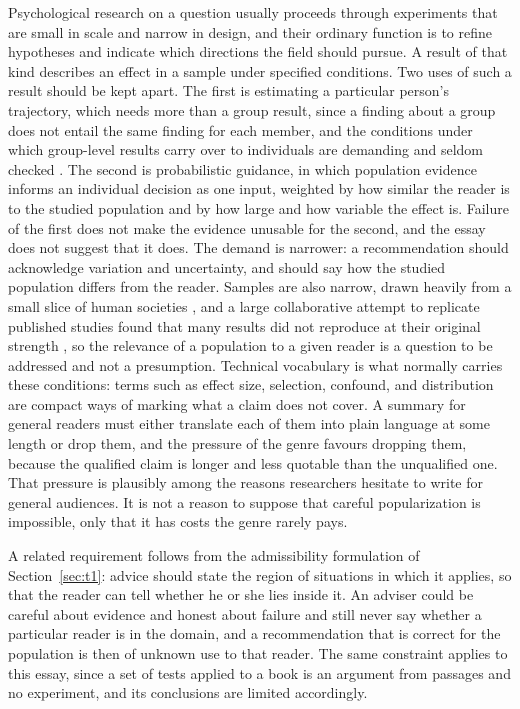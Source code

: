 \documentclass[12pt]{article}
\begin{document}
Psychological research on a question usually proceeds through experiments that are small in scale and narrow in design, and their ordinary function is to refine hypotheses and indicate which directions the field should pursue. A result of that kind describes an effect in a sample under specified conditions. Two uses of such a result should be kept apart. The first is estimating a particular person's trajectory, which needs more than a group result, since a finding about a group does not entail the same finding for each member, and the conditions under which group-level results carry over to individuals are demanding and seldom checked \cite{molenaar2004,fisher2018}. The second is probabilistic guidance, in which population evidence informs an individual decision as one input, weighted by how similar the reader is to the studied population and by how large and how variable the effect is. Failure of the first does not make the evidence unusable for the second, and the essay does not suggest that it does. The demand is narrower: a recommendation should acknowledge variation and uncertainty, and should say how the studied population differs from the reader. Samples are also narrow, drawn heavily from a small slice of human societies \cite{henrich2010}, and a large collaborative attempt to replicate published studies found that many results did not reproduce at their original strength \cite{osc2015}, so the relevance of a population to a given reader is a question to be addressed and not a presumption. Technical vocabulary is what normally carries these conditions: terms such as effect size, selection, confound, and distribution are compact ways of marking what a claim does not cover. A summary for general readers must either translate each of them into plain language at some length or drop them, and the pressure of the genre favours dropping them, because the qualified claim is longer and less quotable than the unqualified one. That pressure is plausibly among the reasons researchers hesitate to write for general audiences. It is not a reason to suppose that careful popularization is impossible, only that it has costs the genre rarely pays.

A related requirement follows from the admissibility formulation of Section~\ref{sec:t1}: advice should state the region of situations in which it applies, so that the reader can tell whether he or she lies inside it. An adviser could be careful about evidence and honest about failure and still never say whether a particular reader is in the domain, and a recommendation that is correct for the population is then of unknown use to that reader. The same constraint applies to this essay, since a set of tests applied to a book is an argument from passages and no experiment, and its conclusions are limited accordingly.
\end{document}
